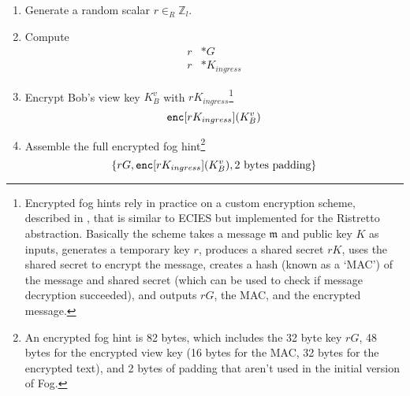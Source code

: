 \begin{enumerate}
    \item Generate a random scalar $r \in_R \mathbb{Z}_l$.
    \item Compute
    \begin{align*}
        r&*G \\
        r&*K_{ingress}
    \end{align*}
    \item Encrypt Bob's view key $K^v_B$ with $r K_{ingress}$\footnote{\label{footnote:fog-hint-encryption-scheme}Encrypted fog hints rely in practice on a custom encryption scheme, described in \cite{mobilecoin-custom-payload-encryption}, that is similar to ECIES \cite{practical-cryptography-ecies-scheme} but implemented for the Ristretto abstraction. Basically the scheme takes a message $\mathfrak{m}$ and public key $K$ as inputs, generates a temporary key $r$, produces a shared secret $r K$, uses the shared secret to encrypt the message, creates a hash (known as a `MAC') of the message and shared secret (which can be used to check if message decryption succeeded), and outputs $r G$, the MAC, and the encrypted message.}\vspace{.155cm}
    \[\textrm{\tt enc}[r K_{ingress}](K^v_B)\]
    \item Assemble the full encrypted fog hint\footnote{An encrypted fog hint is 82 bytes, which includes the 32 byte key $r G$, 48 bytes for the encrypted view key (16 bytes for the MAC, 32 bytes for the encrypted text), and 2 bytes of padding that aren't used in the initial version of Fog.}\vspace{.155cm}
    \[\{r G, \textrm{\tt enc}[r K_{ingress}](K^v_B), \textrm{2 bytes padding}\}\]
\end{enumerate}

